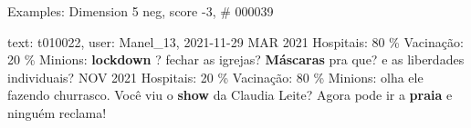 \begin{frame}{Examples: Dimension 5 neg, score -3, \# 000039}
\footnotesize
\begin{alertblock}{text: t010022, user: Manel\_13, 2021-11-29}
MAR 2021 Hospitais: 80 \% Vacinação: 20 \% Minions: \textbf{lockdown} ? fechar 
as igrejas? \textbf{Máscaras} pra que? e as liberdades individuais? NOV 2021 
Hospitais: 20 \% Vacinação: 80 \% Minions: olha ele fazendo churrasco. Você viu 
o \textbf{show} da Claudia Leite? Agora pode ir a \textbf{praia} e ninguém 
reclama!  
\end{alertblock}
\end{frame}
